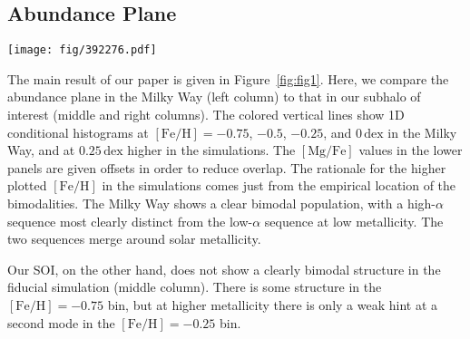 \documentclass[linenumbers, twocolumn]{aastex631}
\newcommand{\FeH}{\ensuremath{[\textrm{Fe}/\textrm{H}]}}
\newcommand{\MgFe}{\ensuremath{[\textrm{Mg}/\textrm{Fe}]}}
\newcommand{\dex}{\ensuremath{\textrm{dex}}}
\begin{document}
\subsection{Abundance Plane}\label{ssec:plane}

\begin{figure*}
  \centering
  \texttt{[image: fig/392276.pdf]}
  \caption{\textbf{When old stars are $\alpha$-enhanced, our subhalo of interest from TNG displays a prominent bimodality.} The upper left panel shows the distribution in the \MgFe{}-\FeH{} plane of the Milky Way, demonstrating a clear bimodality (data selection given in text). The lower left panel shows the 1D histograms of \MgFe{} at fixed \FeH{} values of $-0.5$, $-0.25$, $0$, and $0.25$ (blue, orange, green, and red, respectively). In the Milky Way, the bimodality is strongest at low metallicities while disappearing at high metallicities. The middle column shows the same plots but for our TNG subhalo of interest (392276) and with the fixed \FeH{} values $0.25\,\dex$ lower. No clear bimodality is detected at any metallicity. The right column shows the same subhalo but after increasing the \MgFe{} value of star particles formed before $z=1.5$ linearly with formation time (specifically by incrementing \MgFe{} by $0.1\times\left(t_{1.5}-t_{\textrm{form}}\right)$ if $t_{\textrm{form}} < t_{1.5}$, where $t_{1.5}$ is the age of the universe at $z=1.5$). A clear bimodality is shown in these panels which, unlike in the Milky Way, is present at all metallicities.}
  \label{fig:fig1}
\end{figure*}

The main result of our paper is given in Figure~\ref{fig:fig1}. Here, we compare the abundance plane in the Milky Way (left column) to that in our subhalo of interest (middle and right columns). The colored vertical lines show 1D conditional histograms at $\FeH=-0.75$, $-0.5$, $-0.25$, and $0\,\dex$ in the Milky Way, and at $0.25\,\dex$ higher in the simulations. The \MgFe{} values in the lower panels are given offsets in order to reduce overlap. The rationale for the higher plotted \FeH{} in the simulations comes just from the empirical location of the bimodalities. The Milky Way shows a clear bimodal population, with a high-$\alpha$ sequence most clearly distinct from the low-$\alpha$ sequence at low metallicity. The two sequences merge around solar metallicity.

Our SOI, on the other hand, does not show a clearly bimodal structure in the fiducial simulation (middle column). There is some structure in the $\FeH=-0.75$ bin, but at higher metallicity there is only a weak hint at a second mode in the $\FeH=-0.25$ bin.
\end{document}
